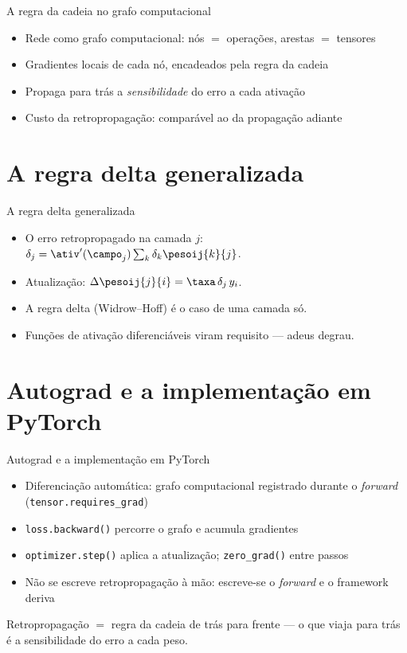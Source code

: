 \documentclass[aspectratio=169, 11pt]{beamer}
\begin{document}
\begin{frame}{A regra da cadeia no grafo computacional}
  \begin{itemize}\setlength{\itemsep}{0.4ex}
    \item Rede como grafo computacional: nós $=$ operações, arestas $=$ tensores
    \item Gradientes locais de cada nó, encadeados pela regra da cadeia
    \item Propaga para trás a \emph{sensibilidade} do erro a cada ativação
    \item Custo da retropropagação: comparável ao da propagação adiante
  \end{itemize}
\end{frame}

\section{A regra delta generalizada}

\begin{frame}{A regra delta generalizada}
  \begin{itemize}\setlength{\itemsep}{0.4ex}
    \item O erro retropropagado na camada $j$: \(\delta_j = \ativ'(\campo_j) \sum_k \delta_k \pesoij{k}{j}\).
    \item Atualização: \(\Delta \pesoij{j}{i} = \taxa\, \delta_j\, y_i\).
    \item A regra delta (Widrow--Hoff) é o caso de uma camada só.
    \item Funções de ativação diferenciáveis viram requisito — adeus degrau.
  \end{itemize}
\end{frame}

\section{Autograd e a implementação em PyTorch}

\begin{frame}{Autograd e a implementação em PyTorch}
  \begin{itemize}\setlength{\itemsep}{0.4ex}
    \item Diferenciação automática: grafo computacional registrado durante o
          \emph{forward} (\texttt{tensor.requires\_grad})
    \item \texttt{loss.backward()} percorre o grafo e acumula gradientes
    \item \texttt{optimizer.step()} aplica a atualização; \texttt{zero\_grad()}
          entre passos
    \item Não se escreve retropropagação à mão: escreve-se o \emph{forward} e o
          framework deriva
  \end{itemize}
  \begin{ideiabox}
    Retropropagação $=$ regra da cadeia de trás para frente — o que viaja para
    trás é a sensibilidade do erro a cada peso.
  \end{ideiabox}
\end{frame}
\end{document}
